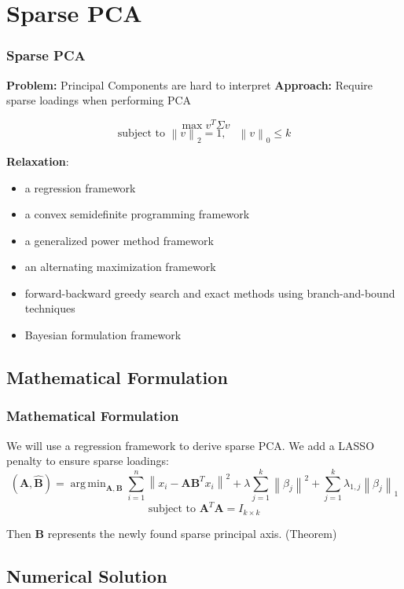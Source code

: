 \documentclass{beamer}
\theoremstyle{plain}
\theoremstyle{definition}
\newcommand{\mat}[1]{\mathbf{#1}}
\DeclareMathOperator*{\argmin}{arg\,min}
\newcommand{\norm}[1]{\left\lVert #1 \right\rVert}
\begin{document}

\section{Sparse PCA}

\begin{frame}
\frametitle{Sparse PCA}
\textbf{Problem:} Principal Components are hard to interpret \linebreak
\textbf{Approach:} Require sparse loadings when performing PCA

$$\max{v^T \Sigma v}$$
$$\text{subject to } \norm{v}_2 = 1, \quad \norm{v}_{0} \leq k$$

\textbf{Relaxation}:
\begin{itemize}
\item a regression framework
\item a convex semidefinite programming framework
\item a generalized power method framework
\item an alternating maximization framework
\item forward-backward greedy search and exact methods using branch-and-bound techniques
\item Bayesian formulation framework
\end{itemize}
\end{frame}

\subsection{Mathematical Formulation}
\begin{frame}
\frametitle{Mathematical Formulation}
We will use a regression framework to derive sparse PCA. We add a LASSO penalty to ensure sparse loadings:
$$(\hat{\mat{A}}, \hat{\mat{B}}) = \argmin_{\mat{A}, \mat{B}} \sum_{i=1}^{n} \norm{x_i - \mat{A}\mat{B}^Tx_i}^2 + \lambda \sum_{j=1}^{k}\norm{\beta_j}^2 + \sum_{j=1}^k \lambda_{1,j} \norm{\beta_j}_1$$
$$\text{subject to } \mat{A}^T\mat{A} = I_{k \times k}$$

Then $\mat B$ represents the newly found sparse principal axis. (Theorem)
\end{frame}

\subsection{Numerical Solution}
\end{document}
